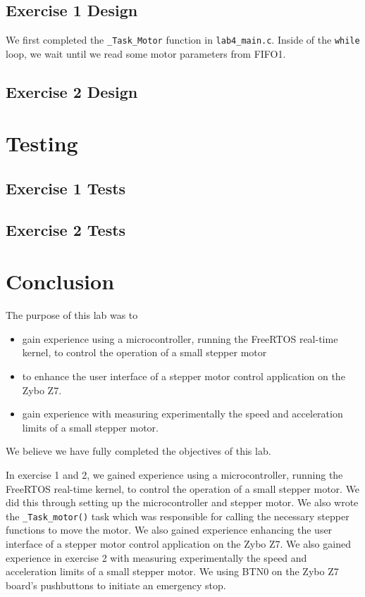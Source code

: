 \documentclass[11pt, letterpaper, titlepage]{article}
\begin{document}
\subsection{Exercise 1 Design}
We first completed the \texttt{_Task_Motor} function in \texttt{lab4_main.c}. Inside of the \texttt{while} loop, we wait until we read some motor parameters from FIFO1.

\subsection{Exercise 2 Design}


\section{Testing}

\subsection{Exercise 1 Tests}

\subsection{Exercise 2 Tests}

\section{Conclusion}
The purpose of this lab was to 
\begin{itemize}
  \item gain experience using a microcontroller, running the FreeRTOS real-time kernel, to control the operation of a small stepper motor
  \item to enhance the user interface of a stepper motor control application on the Zybo Z7.
  \item gain experience with measuring experimentally the speed and acceleration limits of a small stepper motor.
\end{itemize}

We believe we have fully completed the objectives of this lab.

In exercise 1 and 2, we gained experience using a microcontroller, running the FreeRTOS real-time kernel, to control the operation of a small stepper motor. We did this through setting up the microcontroller and stepper motor. We also wrote the \texttt{_Task_motor()} task which was responsible for calling the necessary stepper functions to move the motor. We also gained experience enhancing the user interface of a stepper motor control application on the Zybo Z7. We also gained experience in exercise 2 with measuring experimentally the speed and acceleration limits of a small stepper motor. We using BTN0 on the Zybo Z7 board's pushbuttons to initiate an emergency stop.
\end{document}
